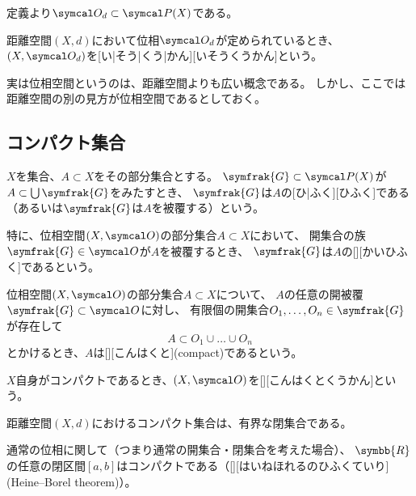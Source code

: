 \documentclass[../sotsu.tex]{subfiles}
\begin{document}
定義より$\topology_d \subset \pset(X)$である。

\begin{definition}
    \label{dfn:topological-space}
    距離空間$(X, d)$において位相$\topology_d$が定められているとき、
    $(X, \topology_d)$を[い|そう|くう|かん][いそうくうかん]という。
\end{definition}

実は位相空間というのは、距離空間よりも広い概念である。
しかし、ここでは距離空間の別の見方が位相空間であるとしておく。



\subsection{コンパクト集合}

\begin{definition}[被覆]
    $X$を集合、$A \subset X$をその部分集合とする。
    $\symfrak{G} \subset \pset(X)$が$A \subset \bigcup \symfrak{G}$をみたすとき、
    $\symfrak{G}$は$A$の[ひ|ふく][ひふく]である（あるいは$\symfrak{G}$は$A$を被覆する）という\cite[\S 22]{uchida-set-2020}。
\end{definition}

特に、位相空間$(X, \topology)$の部分集合$A \subset X$において、
開集合の族$\symfrak{G} \in \topology$が$A$を被覆するとき、
$\symfrak{G}$は$A$の[][かいひふく]であるという。

\begin{definition}[コンパクト集合]
    位相空間$(X, \topology)$の部分集合$A \subset X$について、
    $A$の任意の開被覆$\symfrak{G} \subset \topology$に対し、
    有限個の開集合$O_1, \dots, O_n \in \symfrak{G}$が存在して
    \begin{equation*}
        A \subset O_1 \cup \dots \cup O_n
    \end{equation*}
    とかけるとき、$A$は[][こんはくと](compact)であるという。

    $X$自身がコンパクトであるとき、$(X, \topology)$を[][こんはくとくうかん]という\cite[\S 22]{uchida-set-2020}。
\end{definition}

\begin{proposition}
    \label{thm:compact-set-is-bounded-closed-set}
    距離空間$(X, d)$におけるコンパクト集合は、有界な閉集合である\cite[\S 22]{uchida-set-2020}。
\end{proposition}

\begin{theorem}
    \label{thm:Heine-Borel-theorem}
    通常の位相に関して（つまり通常の開集合・閉集合を考えた場合）、
    $\symbb{R}$の任意の閉区間$[a, b]$はコンパクトである（[][はいねほれるのひふくていり](Heine--Borel theorem)）\cite[\S 22]{uchida-set-2020}。
\end{theorem}
\end{document}
